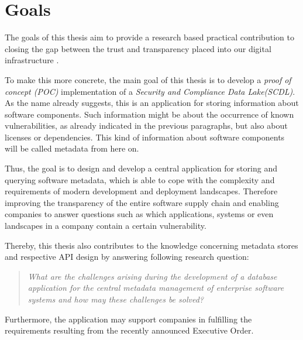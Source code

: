 \section{Goals}
The goals of this thesis aim to provide a research based practical contribution to closing the gap between the trust and transparency placed into our digital infrastructure \cite{ExecutiveOrderSBOM}.\par 
To make this more concrete, the main goal of this thesis is to develop a \textit{proof of concept (POC)} implementation of a \textit{Security and Compliance Data Lake(SCDL)}. As the name already suggests, this is an application for storing information about software components. Such information might be about the occurrence of known vulnerabilities, as already indicated in the previous paragraphs, but also about licenses or dependencies. This kind of information about software components will be called metadata from here on.\par
Thus, the goal is to design and develop a central application for storing and querying software metadata, which is able to cope with the complexity and requirements of modern development and deployment landscapes. Therefore improving the transparency of the entire software supply chain and enabling companies to answer questions such as which applications, systems or even landscapes in a company contain a certain vulnerability.\par
Thereby, this thesis also contributes to the knowledge concerning metadata stores and respective API design by answering following research question:
\begin{quote}
	\emph{What are the challenges arising during the development of a database application for the central metadata management of enterprise software systems and how may these challenges be solved?}
\end{quote}

Furthermore, the application may support companies in fulfilling the requirements resulting from the recently announced Executive Order. 


